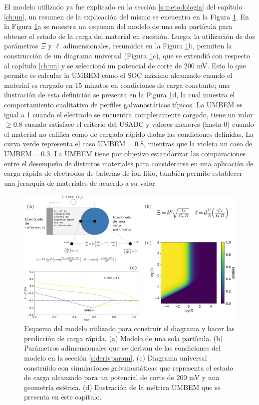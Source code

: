 El modelo utilizado ya fue explicado en la sección \ref{s:metodologia} del
capítulo \ref{ch:un}, un resumen de la explicación del mismo se encuentra 
en la Figura \ref{fig:explicacion}. En la Figura \ref{fig:explicacion}a se 
muestra un esquema del modelo de una sola partícula para obtener el estado
de la carga del material en cuestión. Luego, la utilización de dos parámetros
$\Xi$ y $\ell$ adimensionales, resumidos en la Figura \ref{fig:explicacion}b,
permiten la construcción de un diagrama universal (Figura 
\ref{fig:explicacion}c), que se extendió con respecto al capítulo \ref{ch:un}
y se seleccionó un potencial de corte de 200 mV. Esto lo que permite es 
calcular la UMBEM como el SOC máximo alcanzado cuando el material es cargado
en 15 minutos en condiciones de carga constante; una ilustración de esta 
definición se presenta en la Figura \ref{fig:explicacion}d, la cual muestra 
el comportamiento cualitativo de perfiles galvanostáticos típicos. La UMBEM
es igual a 1 cuando el electrodo se encuentra completamente cargado, tiene
un valor $\geq 0.8$ cuando satisface el criterio del USABC \cite{USABC} y
valores menores (hasta 0) cuando el material no califica como de cargado 
rápido dadas las condiciones definidas. La curva verde representa el caso 
UMBEM$ = 0.8$, mientras que la violeta un caso de UMBEM$ = 0.3$. La UMBEM 
tiene por objetivo estandarizar las comparaciones entre el desempeño de distintos 
materiales para considerarse en una aplicación de carga rápida de electrodos
de baterías de ion-litio, también permite establecer una jerarquía de 
materiales de acuerdo a su valor.
\begin{figure}[h!]
    \centering
    \includegraphics[width=\textwidth]{FastCharging/umbem/explicacion/explicacion.png}
    \caption{Esquema del modelo utilizado para construir el diagrama y hacer 
    las predicción de carga rápida. (a) Modelo de una sola partícula. (b) 
    Parámetros adimensionales que se derivan de las condiciones del modelo 
    en la sección \ref{s:derivparam}. (c) Diagrama universal construido con 
    simulaciones galvanostáticas que representa el estado de carga alcanzado para 
    un potencial de corte de 200 mV y una geometría esférica. (d) Ilustración
    de la métrica UMBEM que se presenta en este capítulo.}
    \label{fig:explicacion}
\end{figure}



